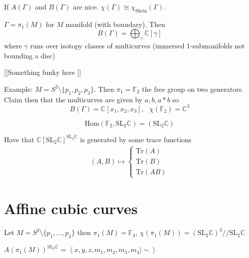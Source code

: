 \begin{corollary}
    If $A(\Gamma) $ and $B(\Gamma)$ are nice. 
    $\chi (\Gamma) \cong \chi_{\mathrm{Skein}}(\Gamma) $. 
\end{corollary}

\begin{theorem}
    $\Gamma = \pi_1 ( M) $ for $ M $ manifold (with boundary). 
    Then 
    \begin{equation}
        B(\Gamma)  = \bigoplus_ \gamma \mathbb{C} [\gamma] 
    \end{equation}
    where $\gamma$ runs over isotopy classes of multicurves (immersed 1-submanifolds not bounding a disc) 
\end{theorem}
[[Something funky here ]] 

Example:
$M = S^2 \setminus \{ p_1, p_2, p_3 \} $. 
Then $ \pi_1 = \mathbb{F} _2 $ the free group on two generators. 
Claim then that the multicurves are given by $a, b , a*b $ so 
\begin{equation}
    B(\Gamma) = \mathbb{C} [x_1, x_2, x_3] , ~~~ \chi( \mathbb{F} _2) = \mathbb{C} ^3 
\end{equation}

\begin{equation}
    \mathrm{Hom}(\mathbb{F} _2 , \mathrm{SL}_2 \mathbb{C} ) = ( \mathrm{SL}_2 \mathbb{C} ) 
\end{equation}

Have that $ \mathbb{C} [ \mathrm{SL}_2 \mathbb{C} ] ^{\mathrm{SL}_2 \mathbb{C} } $ 
is generated by some trace functions 
\begin{align}
    (A,B) \mapsto \begin{cases}
        \mathrm{Tr} ( A)  \\
        \mathrm{Tr} ( B) \\
        \mathrm{Tr} ( AB) 
    \end{cases}
\end{align}


\section{Affine cubic curves} %

Let $ M = S^2 \setminus \{p_1, \dots, p_4 \} $ 
then $ \pi_1 (M) = \mathbb{F} _3 $, $ \chi(\pi_1 ( M) ) = ( \mathrm{SL}_2 \mathbb{C} ) ^3 // \mathrm{SL}_2 \mathbb{C} $

$ A(\pi_1 ( M) ) ^{\mathrm{SL}_2 \mathbb{C} }  = \left<x,y,z, m_1, m_2, m_3, m_4 | \sim \right>$ 

